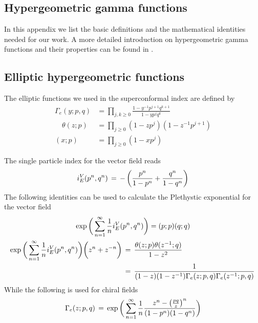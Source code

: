 \begin{appendices}
\chapter{Hypergeometric gamma  functions}
\label{appendix:gamma_functions}
In this appendix we list the basic definitions and the mathematical identities needed for our work.
A more detailed introduction on hypergeometric gamma functions and their properties can be found in \cite{spiridonov2008essays,vanDeBult:2007}.
\section{Elliptic hypergeometric functions}
The elliptic functions we used in the superconformal index are defined by
\begin{equation} 
	\begin{aligned}
	   \Gamma_e (y;p,q) &= \prod_{j,k \geq 0} \frac{ 1 - y^{-1} p^{j+1} q^{k+1}}{ 1 - y p^j q^k}\\
	  \quad \theta(z;p) &= \prod_{j \geq 0 } (1- z p^j) ( 1- z^{-1}p^{j+1}) \\
	  (x;p) &= \prod_{j \geq 0} ( 1- xp^j)
  	\end{aligned}
\label{eqn:ellptic_hyper_definitions}
\end{equation}

The single particle index for the vector field reads
\begin{equation}
   i_E^V(p^n,q^n) \, = \, - \left( {p^n \over 1-p^n} + {q^n \over 1-q^n} \right)
\end{equation}
The following identities can be used to calculate the Plethystic exponential for the vector field
\begin{gather}
  \exp \bigg( \sum_{n=1}^{\infty} {1 \over n} i_E^{V} (p^n,q^n) \bigg)  = (p;p) (q;q) 
 \label{eqn:elliptic_index_vector_zero_modes_identity}
 \\
\begin{aligned}
\exp \bigg( \sum_{n=1}^{\infty} {1 \over n} i_E^{V} (p^n,q^n) \bigg) \bigg( z^n + z^{-n} \bigg) \,& =
\,  \frac{ \theta ( z;p) \theta (z^{-1};q) }{ 1-z^2 } \\
& =  \, \frac{1}{ ( 1 - z ) ( 1 - z^{-1}) \Gamma_e( z;p,q) \Gamma_e( z^{-1}; p,q)} \,
\label{eqn:elliptic_index_vector_adjoint}
\end{aligned}
\end{gather}
While the following is used for chiral fields
\begin{equation}
\Gamma_e(z;p,q) \, = \, \exp \bigg( \sum_{n=1}^{\infty} {1 \over n }
 \frac{ z^n - \big( {pq \over z} \big)^n }{(1-p^n) ( 1-q^n)} \bigg)
 \label{eqn:elliptic_gamma_chiral_identity}
\end{equation}



\end{appendices}
